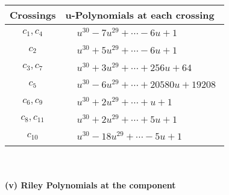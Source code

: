 \documentclass[1p]{elsarticle_modified}
\theoremstyle{definition}
\begin{document}
\begin{tabular}{m{50pt}|m{274pt}}
Crossings & \hspace{64pt}u-Polynomials at each crossing \\
\hline $$\begin{aligned}c_{1},c_{4}\end{aligned}$$&$\begin{aligned}
&u^{30}-7 u^{29}+\cdots-6 u+1
\end{aligned}$\\
\hline $$\begin{aligned}c_{2}\end{aligned}$$&$\begin{aligned}
&u^{30}+5 u^{29}+\cdots-6 u+1
\end{aligned}$\\
\hline $$\begin{aligned}c_{3},c_{7}\end{aligned}$$&$\begin{aligned}
&u^{30}+3 u^{29}+\cdots+256 u+64
\end{aligned}$\\
\hline $$\begin{aligned}c_{5}\end{aligned}$$&$\begin{aligned}
&u^{30}-6 u^{29}+\cdots+20580 u+19208
\end{aligned}$\\
\hline $$\begin{aligned}c_{6},c_{9}\end{aligned}$$&$\begin{aligned}
&u^{30}+2 u^{29}+\cdots+u+1
\end{aligned}$\\
\hline $$\begin{aligned}c_{8},c_{11}\end{aligned}$$&$\begin{aligned}
&u^{30}+2 u^{29}+\cdots+5 u+1
\end{aligned}$\\
\hline $$\begin{aligned}c_{10}\end{aligned}$$&$\begin{aligned}
&u^{30}-18 u^{29}+\cdots-5 u+1
\end{aligned}$\\
\hline
\end{tabular}\\~\\
\newpage\renewcommand{\arraystretch}{1}
\flushleft \textbf{(v) Riley Polynomials at the component}\newline \\
\end{document}
